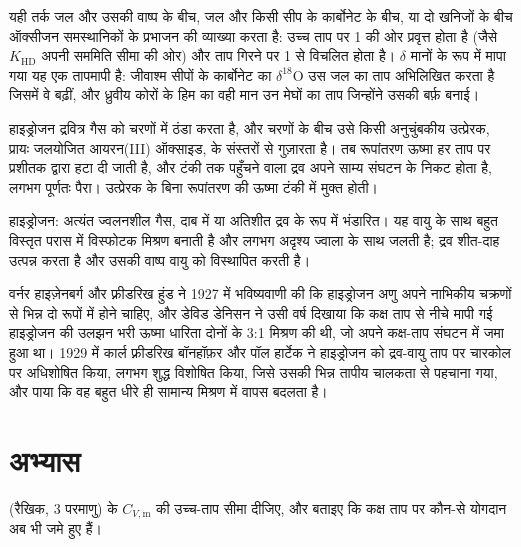 यही तर्क जल और उसकी वाष्प के बीच, जल और किसी सीप के कार्बोनेट के बीच, या दो
खनिजों के बीच ऑक्सीजन समस्थानिकों के प्रभाजन की व्याख्या करता है: 
उच्च ताप पर 1 की ओर प्रवृत्त होता है (जैसे
$K_{\mathrm{HD}}$ अपनी सममिति सीमा की ओर) और ताप गिरने पर 1 से विचलित होता है।
$\delta$ मानों के रूप में मापा गया यह एक तापमापी है: जीवाश्म सीपों के कार्बोनेट का $\delta^{18}$O
उस जल का ताप अभिलिखित करता है जिसमें वे बढ़ीं, और
ध्रुवीय कोरों के हिम का वही मान उन मेघों का ताप जिन्होंने उसकी
बर्फ़ बनाई।

\begin{inthelab}[एक ऑर्थो--पैरा परिवर्तक]
हाइड्रोजन द्रवित्र गैस को चरणों में ठंडा करता है, और चरणों के बीच उसे
किसी अनुचुंबकीय उत्प्रेरक, प्रायः जलयोजित आयरन(III) ऑक्साइड, के संस्तरों से गुज़ारता है।
तब रूपांतरण ऊष्मा हर ताप पर प्रशीतक द्वारा हटा दी जाती है,
और टंकी तक पहुँचने वाला द्रव अपने साम्य संघटन के निकट होता है,
लगभग पूर्णतः पैरा। उत्प्रेरक के बिना रूपांतरण की ऊष्मा
टंकी में मुक्त होती।
\end{inthelab}

\begin{safety}{}
हाइड्रोजन: अत्यंत ज्वलनशील गैस, दाब में या अतिशीत
द्रव के रूप में भंडारित। यह वायु के साथ बहुत विस्तृत परास में विस्फोटक मिश्रण बनाती है और
लगभग अदृश्य ज्वाला के साथ जलती है; द्रव शीत-दाह उत्पन्न करता है और उसकी वाष्प
वायु को विस्थापित करती है।
\end{safety}

\begin{history}[दो हाइड्रोजन, 1927--1929]
वर्नर हाइज़ेनबर्ग और फ़्रीडरिख हुंड ने 1927 में भविष्यवाणी की कि हाइड्रोजन अणु
अपने नाभिकीय चक्रणों से भिन्न दो रूपों में होने चाहिए, और डेविड डेनिसन ने
उसी वर्ष दिखाया कि कक्ष ताप से नीचे मापी गई हाइड्रोजन की उलझन भरी ऊष्मा धारिता
दोनों के 3:1 मिश्रण की थी, जो अपने
कक्ष-ताप संघटन में जमा हुआ था। 1929 में कार्ल फ़्रीडरिख बॉनहॉफ़र और पॉल
हार्टेक ने हाइड्रोजन को द्रव-वायु ताप पर चारकोल पर अधिशोषित किया, लगभग शुद्ध
 विशोषित किया, जिसे उसकी भिन्न तापीय चालकता से पहचाना गया,
और पाया कि वह बहुत धीरे ही सामान्य मिश्रण में वापस बदलता है।
\end{history}

\section{अभ्यास}

\begin{exercise}[$\star$]\label{exo:b3:statistical-thermo-applied:1}
 (रैखिक, 3 परमाणु) के $C_{V,\mathrm m}$ की उच्च-ताप सीमा दीजिए, और बताइए कि
कक्ष ताप पर कौन-से योगदान अब भी जमे हुए हैं।
\end{exercise}

